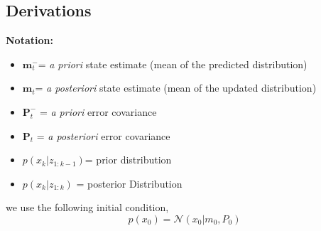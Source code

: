 \documentclass{article}
\renewcommand{\v}[1]{ \ensuremath{ {\mathbf{#1}} }}
\begin{document}
\subsection{Derivations}\label{sec:kalman_derivations}

\textbf{Notation:}
\\
\begin{itemize}
\item $\v m^-_{t}$= \textit{a priori} state estimate (mean of the predicted distribution)
\item $\v m_t$= \textit{a posteriori} state estimate (mean of the updated distribution)
\item $\v P^-_t$ = \textit{a priori} error covariance
\item $\v P_t$ = \textit{a posteriori} error covariance
\item $p(x_k|z_{1:k-1})$=  prior distribution 
\item $p(x_k | z_{1:k})$ =  posterior Distribution
\end{itemize}
we use the following initial condition,
\begin{equation}
p(x_0) = \mathcal{N}(x_0 | m_0, P_0)
\end{equation}
\end{document}
